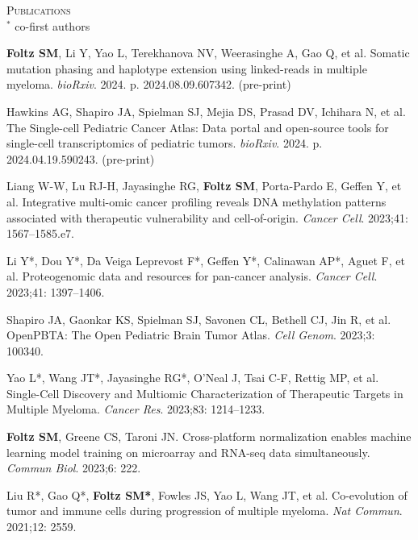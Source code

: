 \documentclass[11pt]{article}
\begin{document}
\hrulefill

\bigskip

\textsc{\Large Publications}\\ $^*$ co-first authors

\begin{etaremune}


\item \textbf{Foltz SM}, Li Y, Yao L, Terekhanova NV, Weerasinghe A, Gao Q, et al. Somatic mutation phasing and haplotype extension using linked-reads in multiple myeloma. \emph{bioRxiv}. 2024. p. 2024.08.09.607342. (pre-print)

\item Hawkins AG, Shapiro JA, Spielman SJ, Mejia DS, Prasad DV, Ichihara N, et al. The Single-cell Pediatric Cancer Atlas: Data portal and open-source tools for single-cell transcriptomics of pediatric tumors. \emph{bioRxiv}. 2024. p. 2024.04.19.590243. (pre-print)

\item Liang W-W, Lu RJ-H, Jayasinghe RG, \textbf{Foltz SM}, Porta-Pardo E, Geffen Y, et al. Integrative multi-omic cancer profiling reveals DNA methylation patterns associated with therapeutic vulnerability and cell-of-origin. \emph{Cancer Cell}. 2023;41: 1567–1585.e7.

\item Li Y*, Dou Y*, Da Veiga Leprevost F*, Geffen Y*, Calinawan AP*, Aguet F, et al. Proteogenomic data and resources for pan-cancer analysis. \emph{Cancer Cell}. 2023;41: 1397–1406.

\item Shapiro JA, Gaonkar KS, Spielman SJ, Savonen CL, Bethell CJ, Jin R, et al. OpenPBTA: The Open Pediatric Brain Tumor Atlas. \emph{Cell Genom}. 2023;3: 100340.

\item Yao L*, Wang JT*, Jayasinghe RG*, O’Neal J, Tsai C-F, Rettig MP, et al. Single-Cell Discovery and Multiomic Characterization of Therapeutic Targets in Multiple Myeloma. \emph{Cancer Res}. 2023;83: 1214–1233.

\item \textbf{Foltz SM}, Greene CS, Taroni JN. Cross-platform normalization enables machine learning model training on microarray and RNA-seq data simultaneously. \emph{Commun Biol}. 2023;6: 222.

\item Liu R*, Gao Q*, \textbf{Foltz SM*}, Fowles JS, Yao L, Wang JT, et al. Co-evolution of tumor and immune cells during progression of multiple myeloma. \emph{Nat Commun}. 2021;12: 2559.


\end{etaremune}
\end{document}
